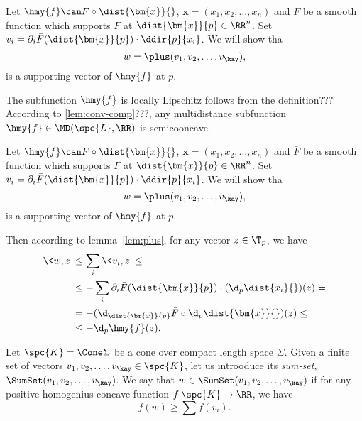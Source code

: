Let $\hmy{f}\can F\circ\dist{\bm{x}}{}$, 
$\bm{x}=(x_1,x_2,\dots,x_n)$
and $\bar F$ be a smooth function which supports $F$ at $\dist{\bm{x}}{p}\in\RR^n$.
Set $v_i=\partial_i\bar F(\dist{\bm{x}}{p})\cdot \ddir{p}{x_i}$.
We will show tha
$$w=\plus(v_1,v_2,\dots,v_\kay),$$
is a supporting vector of $\hmy{f}$ at $p$.





















The subfunction $\hmy{f}$ is locally Lipschitz follows from the definition???
According to \ref{lem:conv-comp}???, any multidistance subfunction $\hmy{f}\in\MD(\spc{L},\RR)$ is semicooncave.

Let $\hmy{f}\can F\circ\dist{\bm{x}}{}$, 
$\bm{x}=(x_1,x_2,\dots,x_n)$
and $\bar F$ be a smooth function which supports $F$ at $\dist{\bm{x}}{p}\in\RR^n$.
Set $v_i=\partial_i\bar F(\dist{\bm{x}}{p})\cdot \ddir{p}{x_i}$.
We will show tha
$$w=\plus(v_1,v_2,\dots,v_\kay),$$
is a supporting vector of $\hmy{f}$ at $p$.

Then according to lemma~\ref{lem:plus}, for any vector $z\in\T_p$, we have
\begin{align*}
\<w,z\>
&\le
\sum_i\<v_i,z\>
\le
\\
&\le
-\sum_i\partial_i\bar F(\dist{\bm{x}}{p})\cdot (\d_p\dist{x_i}{})(z)
=
\\
&=
-(\d_{\dist{\bm{x}}{p}}\bar F\circ\d_p\dist{\bm{x}}{})(z)
\le
\\
&\le
-\d_p\hmy{f}(z).
\end{align*}
\qedsf























Let $\spc{K}=\Cone\Sigma$ be a cone over compact length space $\Sigma$.
Given a finite set of  vectors $v_1,v_2,\dots,v_\kay\in \spc{K}$,
let us introoduce its \emph{sum-set}, $\SumSet(v_1,v_2,\dots,v_\kay)$.
We say that $w\in\SumSet(v_1,v_2,\dots,v_\kay)$ if for any positive homogenius concave function $f\:\spc{K}\to\RR$,
we have 
$$f(w)\ge\sum f(v_i).$$


